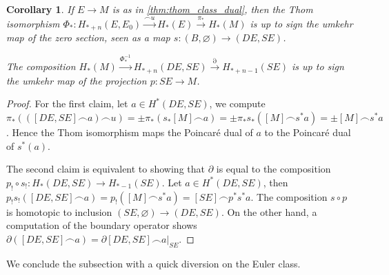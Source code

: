 \documentclass{scrartcl}
\theoremstyle{plain}
\newtheorem{corollary}[theorem]{Corollary}
\theoremstyle{definition}
\renewcommand{\emptyset}{\varnothing}
\newcommand{\capp}{\mathbin{\frown}}
\let\xto\xrightarrow
\newcommand{\comp}{\mathbin{\circ}}
\begin{document}
\begin{corollary} \label{thm:thom_iso_umkehr}
        If $E\to M$ is as in \cref{thm:thom_class_dual}, then the Thom isomorphism $\Phi_*\colon H_{*+n}(E, E_0) \xrightarrow{\capp u} H_*(E)\xrightarrow{\pi_*}H_*(M)$ is up to sign the umkehr map of the zero section, seen as a map $s\colon (B, \emptyset) \to (DE, SE)$. 
        
        The composition $H_*(M)\xto{\Phi_*^{-1}} H_{*+n}(DE, SE) \xto{\partial} H_{*+n-1}(SE)$ is up to sign the umkehr map of the projection $p\colon SE\to M$.
\end{corollary}
\begin{proof}
    For the first claim, let $a\in H^*(DE, SE)$, we compute $\pi_*(([DE, SE]\capp a)\capp u) = \pm\pi_*(s_*[M] \capp a) = \pm \pi_*s_*([M]\capp s^*a) = \pm[M] \capp s^* a$. Hence the Thom isomorphism maps the Poincaré dual of $a$ to the Poincaré dual of $s^*(a)$. 

    The second claim is equivalent to showing that $\partial$ is equal to the composition $p_!\comp s_!\colon H_*(DE, SE) \to H_{*-1}(SE)$. Let $a\in H^*(DE, SE)$, then $p_!s_!([DE, SE]\capp a) = p_!([M] \capp s^*a) = [SE]\capp p^*s^*a$. The composition $s\comp p$ is homotopic to inclusion $(SE, \emptyset)\to (DE, SE)$. On the other hand, a computation of the boundary operator shows $\partial([DE, SE]\capp a) = \partial[DE,SE] \capp a|_{SE}$. 
\end{proof}


We conclude the subsection with a quick diversion on the Euler class.
\end{document}
